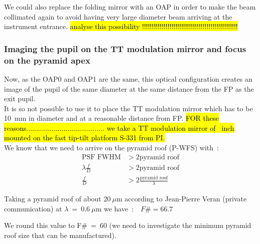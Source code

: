 \documentclass[12pt,a4paper]{article}
\begin{document}
We could also replace the folding mirror with an OAP in order to make the beam collimated again to avoid having very large diameter beam arriving at the instrument entrance.
\hl{analyse this possibility !!!!!!!!!!!!!!!!!!!!!!!!!!!!!!!!!!!!!!!!!!!!!!!!!}

\subsubsection{Imaging the pupil on the TT modulation mirror and focus on the pyramid apex}\label{subsubsec:TTMM}
Now, as the OAP0 and OAP1 are the same, this optical configuration creates an image of the pupil of the same diameter at the same distance from the FP as the exit pupil.\\ 
It is so not possible to use it to place the TT modulation mirror which has to be 10~mm in diameter and at a reasonable distance from FP.
\hl{FOR these reasons........................................ we take a TT modulation mirror of ~inch mounted on the fast tip-tilt platform S-331 from PI.}\\

We know that we need to arrive on the pyramid roof (P-WFS) with~:
\begin{eqnarray}
	\text{PSF FWHM} &> 2\text{pyramid roof}\nonumber\\
	\lambda\frac{f}{D} &> 2\text{pyramid roof}\nonumber\\
	\frac{f}{D}&>2\frac{\text{pyramid roof}}{\lambda}\label{eq:FnumEq}
\end{eqnarray}

Taking a pyramid roof of about $20~\mu$m according to Jean-Pierre Veran (private communication) at $\lambda~=~0.6~\mu$m we have~:~~$F\# = 66.7\label{eq:Fnum}$

We round this value to F\#~=~60 (we need to investigate the minimum pyramid roof size that can be manufactured).\\
\end{document}
